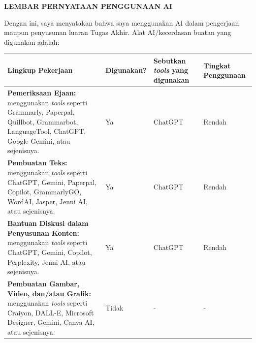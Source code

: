 \clearpage
\pagestyle{empty}

\begin{center}
  {\large\bfseries LEMBAR PERNYATAAN PENGGUNAAN AI}
\end{center}

\begin{singlespace}

\noindent Dengan ini, saya menyatakan bahwa saya menggunakan AI dalam pengerjaan maupun penyusunan luaran Tugas Akhir. Alat AI/kecerdasan buatan yang digunakan adalah:

\vspace{0.6cm}

\noindent
{
  \small
  \renewcommand{\arraystretch}{1.15}
  \begin{tabularx}{\textwidth}{|>{\raggedright\arraybackslash}X|>{\centering\arraybackslash}p{1.9cm}|>{\centering\arraybackslash}p{2.4cm}|>{\centering\arraybackslash}p{2.1cm}|}
    \hline
    \centering\textbf{Lingkup Pekerjaan} & \textbf{Digunakan?} & \textbf{Sebutkan \textit{tools} yang digunakan} & \textbf{Tingkat Penggunaan} \tabularnewline
    \hline
    \textbf{Pemeriksaan Ejaan:} menggunakan \textit{tools} seperti Grammarly, Paperpal, Quillbot, Grammarbot, LanguageTool, ChatGPT, Google Gemini, atau sejenisnya.
                                         & Ya                  & ChatGPT                                & Rendah                      \\
    \hline
    \textbf{Pembuatan Teks:} menggunakan \textit{tools} seperti ChatGPT, Gemini, Paperpal, Copilot, GrammarlyGO, WordAI, Jasper, Jenni AI, atau sejenisnya.
                                         & Ya                  & ChatGPT                                & Rendah                      \\
    \hline
    \textbf{Bantuan Diskusi dalam Penyusunan Konten:} menggunakan \textit{tools} seperti ChatGPT, Gemini, Copilot, Perplexity, Jenni AI, atau sejenisnya.
                                         & Ya                  & ChatGPT                                & Rendah                      \\
    \hline
    \textbf{Pembuatan Gambar, Video, dan/atau Grafik:} menggunakan \textit{tools} seperti Craiyon, DALL-E, Microsoft Designer, Gemini, Canva AI, atau sejenisnya.
                                         & Tidak               & -                                      & -                           \\
    \hline
  \end{tabularx}
}


\end{singlespace}
